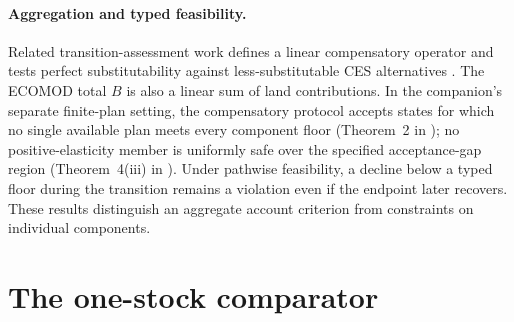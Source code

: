 \documentclass[11pt,a4paper]{article}
\begin{document}
\paragraph{Aggregation and typed feasibility.} Related transition-assessment work defines a linear compensatory operator and tests perfect substitutability against less-substitutable CES alternatives \citep[Sections~2 and 4 of][]{Abaee2026b}. The ECOMOD total $B$ is also a linear sum of land contributions. In the companion's separate finite-plan setting, the compensatory protocol accepts states for which no single available plan meets every component floor (Theorem~2 in \citet{Abaee2026b}); no positive-elasticity member is uniformly safe over the specified acceptance-gap region (Theorem~4(iii) in \citet{Abaee2026b}). Under pathwise feasibility, a decline below a typed floor during the transition remains a violation even if the endpoint later recovers. These results distinguish an aggregate account criterion from constraints on individual components.

\section{The one-stock comparator}\label{si:onestock}
\end{document}
